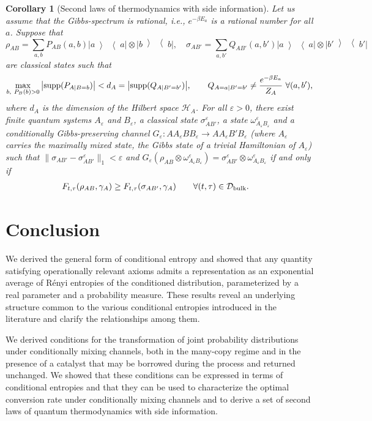 \documentclass[aps,pra,11pt,onecolumn,nofootinbib,tightenlines]{revtex4-2}
\newtheorem{corollary}[theorem]{Corollary}
\theoremstyle{definition}
\newcommand{\mc}[1]{\mathcal{#1}}
\newcommand{\ketbra}[2]{\left|#1\middle\rangle\middle\langle #2\right|}
\begin{document}
\begin{corollary}[Second laws of thermodynamics with side information]\label{cor:secondlaws}
Let us assume that the Gibbs-spectrum is rational, i.e., $e^{-\beta E_a}$ is a rational number for all $a$. Suppose that
\begin{equation}
\rho_{AB}=\sum_{a,b}P_{AB}(a,b)\ketbra{a}{a}\otimes\ketbra{b}{b},\quad\sigma_{AB'}=\sum_{a,b'}Q_{AB'}(a,b')\ketbra{a}{a}\otimes\ketbra{b'}{b'}
\end{equation}
are classical states such that
\begin{equation}
\max_{b,\ P_B(b)>0}\big|{\rm supp}(P_{A|B=b})\big| <d_A=\big|{\rm supp}(Q_{A|B'=b'})\big|,\qquad Q_{A=a|B'=b'}\neq\frac{e^{-\beta E_a}}{Z_A}\ \forall(a,b'),
\end{equation}
where $d_A$ is the dimension of the Hilbert space $\mc H_A$. For all $\varepsilon>0$, there exist finite quantum systems $A_\varepsilon$ and $B_\varepsilon$, a classical state $\sigma^\varepsilon_{AB'}$, a state $\omega^\varepsilon_{A_\varepsilon B_\varepsilon}$ and a conditionally Gibbs-preserving channel $G_\varepsilon:AA_\varepsilon BB_\varepsilon\to AA_\varepsilon B'B_\varepsilon$ (where $A_\varepsilon$ carries the maximally mixed state, the Gibbs state of a trivial Hamiltonian of $A_\varepsilon$) such that $\|\sigma_{AB'}-\sigma^\varepsilon_{AB'}\|_1<\varepsilon$ and $G_\varepsilon(\rho_{AB}\otimes\omega^\varepsilon_{A_\varepsilon B_\varepsilon})=\sigma^\varepsilon_{AB'}\otimes\omega^\varepsilon_{A_\varepsilon B_\varepsilon}$ if and only if
\begin{align}
F_{t,\tau}(\rho_{AB},\gamma_A)&\geq F_{t,\tau}(\sigma_{AB'},\gamma_A)\qquad\forall(t,\tau)\in\mc D_{\rm bulk}.
\end{align}
\end{corollary}

\section{Conclusion}
We derived the general form of conditional entropy and showed that any quantity satisfying operationally relevant axioms admits a representation as an exponential average of R\'enyi entropies of the conditioned distribution, parameterized by a real parameter and a probability measure. 
These results reveal an underlying structure common to the various conditional entropies introduced in the literature and clarify the relationships among them.




We derived conditions for the transformation of joint probability distributions under conditionally mixing channels, both in the many-copy regime and in the presence of a catalyst that may be borrowed during the process and returned unchanged. We showed that these conditions can be expressed in terms of conditional entropies
and that they can be used to characterize the optimal conversion rate under conditionally mixing channels and to derive a set of second laws of quantum thermodynamics with side information.
\end{document}
